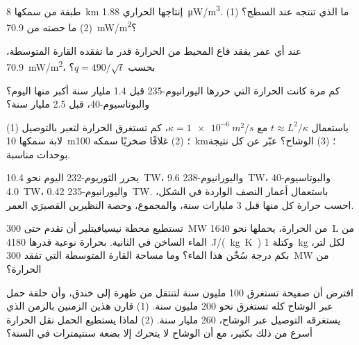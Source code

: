\begin{exercise}[$\star\star$]\label{exo:g12:internal-heat:8}
طبقة من  سمكها \qty{8}{km} إنتاجها الحراري
\qty{1.88}{\micro W/m^3}. (1) ما  الذي تنتجه عند السطح؟
(2) ما حصته من \qty{70.9}{mW/m^2}؟
\end{exercise}

\begin{exercise}[$\star\star$]\label{exo:g12:internal-heat:9}
عند أي عمر يفقد قاع المحيط من الحرارة قدر ما تفقده القارة المتوسطة،
\qty{70.9}{mW/m^2}، بحسب $q = 490/\sqrt{t}$؟
\end{exercise}

\begin{exercise}[$\star\star$]\label{exo:g12:internal-heat:10}
كم مرة كانت الحرارة التي حررها اليورانيوم-235 قبل 1.4 مليار سنة أكبر منها
اليوم؟ والبوتاسيوم-40، قبل 2.5 مليار سنة؟
\end{exercise}

\begin{exercise}[$\star\star$]\label{exo:g12:internal-heat:11}
باستعمال $t \approx L^2/\kappa$ مع $\kappa = \qty{1e-6}{m^2/s}$، كم
تستغرق الحرارة لتعبر بالتوصيل (1) لابة سمكها \qty{10}{m}؛
(2) غلافًا صخريًا سمكه \qty{100}{km}؛ (3) الوشاح؟ عبّر عن كل نتيجة
بوحدات مناسبة.
\end{exercise}

\begin{exercise}[$\star\star\star$]\label{exo:g12:internal-heat:12}
يحرر الثوريوم-232 اليوم نحو \qty{10.4}{TW}، واليورانيوم-238 \qty{9.6}{TW}،
والبوتاسيوم-40 \qty{4.0}{TW}، واليورانيوم-235 \qty{0.42}{TW}. باستعمال
أعمار النصف الواردة في الشكل، احسب حرارة
كل منها قبل 3 مليارات سنة، والمجموع، وحصة النظيرين
القصيرَي العمر.
\end{exercise}

\begin{exercise}[$\star\star\star$]\label{exo:g12:internal-heat:13}
تستطيع محطة نيسيافيتلير أن تقدم حتى \qty{300}{MW} من الحرارة،
يحملها نحو \qty{1640}{L} من الماء الساخن في الثانية. بحرارة نوعية
قدرها \qty{4180}{J/(kg.K)} وكتلة \qty{1}{kg} لكل لتر، بكم
درجة سُخّن هذا الماء؟ وما مساحة القارة المتوسطة التي
تفقد \qty{300}{MW} من الحرارة؟
\end{exercise}

\begin{exercise}[$\star\star\star$]\label{exo:g12:internal-heat:14}
افترض أن صفيحة تستغرق 100 مليون سنة لتنتقل من ظهرة إلى خندق، وأن
حلقة حمل عبر الوشاح كله تستغرق نحو 200 مليون سنة. (1)
قارن هذين الزمنين بالزمن الذي يستغرقه التوصيل عبر الوشاح،
260 مليار سنة. (2) لماذا يستطيع الحمل نقل الحرارة أسرع من ذلك بكثير، مع أن
الوشاح لا يتحرك إلا بضعة سنتيمترات في السنة؟
\end{exercise}

